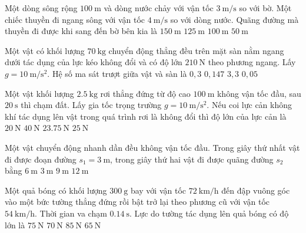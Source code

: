 \begin{ex}
	Một dòng sông rộng $\SI{100}{\meter}$ và dòng nước chảy với vận tốc $\SI{3}{\meter/\second}$ so với bờ. Một chiếc thuyền đi ngang sông với vận tốc $\SI{4}{\meter/\second}$ so với dòng nước. Quãng đường mà thuyền đi được khi sang đến bờ bên kia là
	\choice
	{$\SI{150}{\meter}$}
	{\True $\SI{125}{\meter}$}
	{$\SI{100}{\meter}$}
	{$\SI{50}{\meter}$}
	\loigiai{}
\end{ex}
\begin{ex}
	Một vật có khối lượng $\SI{70}{\kilogram}$ chuyển động thẳng đều trên mặt sàn nằm ngang dưới tác dụng của lực kéo không đổi và có độ lớn $\SI{210}{\newton}$ theo phương ngang. Lấy $g=\SI{10}{\meter/\second^2}$. Hệ số ma sát trượt giữa vật và sàn là
	\choice
	{\True $0,3$}
	{$0,147$}
	{$3,3$}
	{$0,05$}
	\loigiai{}
\end{ex}
\begin{ex}
	Một vật khối lượng $\SI{2.5}{\kilogram}$ rơi thẳng đứng từ độ cao $\SI{100}{\meter}$ không vận tốc đầu, sau $\SI{20}{\second}$ thì chạm đất. Lấy gia tốc trọng trường $g=\SI{10}{\meter/\second^2}$. Nếu coi lực cản không khí tác dụng lên vật trong quá trình rơi là không đổi thì độ lớn của lực cản là
	\choice
	{$\SI{20}{\newton}$}
	{$\SI{40}{\newton}$}
	{\True $\SI{23.75}{\newton}$}
	{$\SI{25}{\newton}$}
	\loigiai{}
\end{ex}
\begin{ex}
Một vật chuyển động nhanh dần đều không vận tốc đầu. Trong giây thứ nhất vật đi được đoạn đường $s_1=\SI{3}{\meter}$, trong giây thứ hai vật đi được quãng đường $s_2$ bằng	
	\choice
	{$\SI{6}{\meter}$}
	{$\SI{3}{\meter}$}
	{\True $\SI{9}{\meter}$}
	{$\SI{12}{\meter}$}
	\loigiai{}
\end{ex}
\begin{ex}
	Một quả bóng có khối lượng $\SI{300}{\gram}$ bay với vận tốc $\SI{72}{\kilo\meter/\hour}$ đến đập vuông góc vào một bức tường thẳng đứng rồi bật trở lại theo phương cũ với vận tốc $\SI{54}{\kilo\meter/\hour}$. Thời gian va chạm $\SI{0.14}{\second}$. Lực do tường tác dụng lên quả bóng có độ lớn là
	\choice
	{\True $\SI{75}{\newton}$}
	{$\SI{70}{\newton}$}
	{$\SI{85}{\newton}$}
	{$\SI{65}{\newton}$}
	\loigiai{}
\end{ex}
